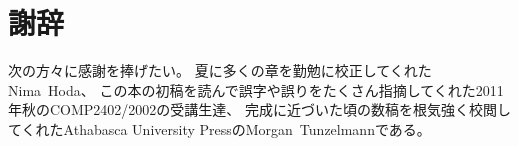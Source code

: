 \chapter*{謝辞}

次の方々に感謝を捧げたい。
夏に多くの章を勤勉に校正してくれたNima~Hoda、
この本の初稿を読んで誤字や誤りをたくさん指摘してくれた2011年秋のCOMP2402/2002の受講生達、
完成に近づいた頃の数稿を根気強く校閲してくれたAthabasca University PressのMorgan~Tunzelmannである。
